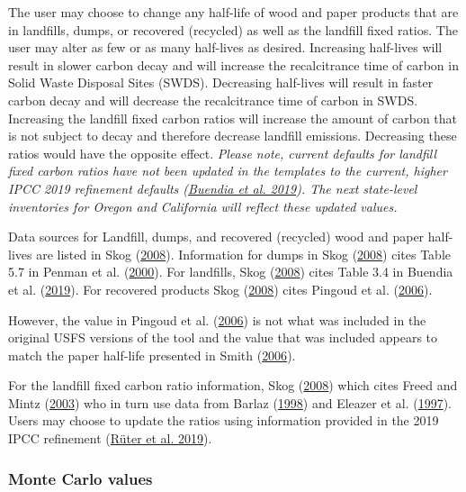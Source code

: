 \documentclass[
  openany]{book}
\begin{document}
The user may choose to change any half-life of wood and paper products
that are in landfills, dumps, or recovered (recycled) as well as the
landfill fixed ratios. The user may alter as few or as many half-lives
as desired. Increasing half-lives will result in slower carbon decay and
will increase the recalcitrance time of carbon in Solid Waste Disposal
Sites (SWDS). Decreasing half-lives will result in faster carbon decay
and will decrease the recalcitrance time of carbon in SWDS. Increasing
the landfill fixed carbon ratios will increase the amount of carbon that
is not subject to decay and therefore decrease landfill emissions.
Decreasing these ratios would have the opposite effect. \emph{Please
note, current defaults for landfill fixed carbon ratios have not been
updated in the templates to the current, higher IPCC 2019 refinement
defaults (\protect\hyperlink{ref-buendia2019}{Buendia et al. 2019}). The
next state-level inventories for Oregon and California will reflect
these updated values.}

Data sources for Landfill, dumps, and recovered (recycled) wood and
paper half-lives are listed in Skog
(\protect\hyperlink{ref-skog2008}{2008}). Information for dumps in Skog
(\protect\hyperlink{ref-skog2008}{2008}) cites Table 5.7 in Penman et
al. (\protect\hyperlink{ref-penman2000}{2000}). For landfills, Skog
(\protect\hyperlink{ref-skog2008}{2008}) cites Table 3.4 in Buendia et
al. (\protect\hyperlink{ref-buendia2019}{2019}). For recovered products
Skog (\protect\hyperlink{ref-skog2008}{2008}) cites Pingoud et al.
(\protect\hyperlink{ref-pingoud2006}{2006}).

However, the value in Pingoud et al.
(\protect\hyperlink{ref-pingoud2006}{2006}) is not what was included in
the original USFS versions of the tool and the value that was included
appears to match the paper half-life presented in Smith
(\protect\hyperlink{ref-smith2006}{2006}).

For the landfill fixed carbon ratio information, Skog
(\protect\hyperlink{ref-skog2008}{2008}) which cites Freed and Mintz
(\protect\hyperlink{ref-freed2003}{2003}) who in turn use data from
Barlaz (\protect\hyperlink{ref-barlaz1998}{1998}) and Eleazer et al.
(\protect\hyperlink{ref-eleazer1997}{1997}). Users may choose to update
the ratios using information provided in the 2019 IPCC refinement
(\protect\hyperlink{ref-ruter2019}{Rüter et al. 2019}).

\hypertarget{own-prov-input-mc}{%
\subsubsection{Monte Carlo values}\label{own-prov-input-mc}}
\end{document}
